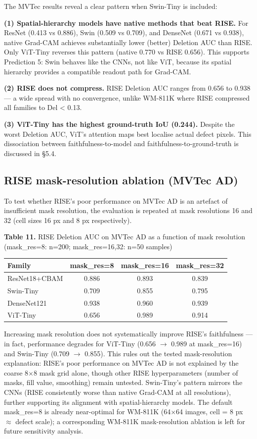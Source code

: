\documentclass[11pt,a4paper]{article}
\begin{document}
The MVTec results reveal a clear pattern when Swin-Tiny is included:

\textbf{(1) Spatial-hierarchy models have native methods that beat RISE.} For ResNet (0.413 vs 0.886), Swin (0.509 vs 0.709), and DenseNet (0.671 vs 0.938), native Grad-CAM achieves substantially lower (better) Deletion AUC than RISE. Only ViT-Tiny reverses this pattern (native 0.770 vs RISE 0.656). This supports Prediction 5: Swin behaves like the CNNs, not like ViT, because its spatial hierarchy provides a compatible readout path for Grad-CAM.

\textbf{(2) RISE does not compress.} RISE Deletion AUC ranges from 0.656 to 0.938 --- a wide spread with no convergence, unlike WM-811K where RISE compressed all families to Del < 0.13.

\textbf{(3) ViT-Tiny has the highest ground-truth IoU (0.244).} Despite the worst Deletion AUC, ViT's attention maps best localise actual defect pixels. This dissociation between faithfulness-to-model and faithfulness-to-ground-truth is discussed in \S{}5.4.


\subsection{RISE mask-resolution ablation (MVTec AD)}

To test whether RISE's poor performance on MVTec AD is an artefact of insufficient mask resolution, the evaluation is repeated at mask resolutions 16 and 32 (cell sizes 16 px and 8 px respectively).

\begin{center}
\small \textbf{Table 11.} RISE Deletion AUC on MVTec AD as a function of mask resolution (mask\_res=8: n=200; mask\_res=16,32: n=50 samples)
\end{center}

\begin{tabular}{lccc}
\toprule
Family & mask\_res=8 & mask\_res=16 & mask\_res=32 \\
\midrule
ResNet18+CBAM & 0.886 & 0.893 & 0.839 \\
Swin-Tiny & 0.709 & 0.855 & 0.795 \\
DenseNet121 & 0.938 & 0.960 & 0.939 \\
ViT-Tiny & 0.656 & 0.989 & 0.914 \\
\bottomrule
\end{tabular}


Increasing mask resolution does not systematically improve RISE's faithfulness --- in fact, performance degrades for ViT-Tiny (0.656 $\rightarrow$ 0.989 at mask\_res=16) and Swin-Tiny (0.709 $\rightarrow$ 0.855). This rules out the tested mask-resolution explanation: RISE's poor performance on MVTec AD is not explained by the coarse 8$\times$8 mask grid alone, though other RISE hyperparameters (number of masks, fill value, smoothing) remain untested. Swin-Tiny's pattern mirrors the CNNs (RISE consistently worse than native Grad-CAM at all resolutions), further supporting its alignment with spatial-hierarchy models. The default mask\_res=8 is already near-optimal for WM-811K (64$\times$64 images, cell = 8 px $\approx$ defect scale); a corresponding WM-811K mask-resolution ablation is left for future sensitivity analysis.
\end{document}
